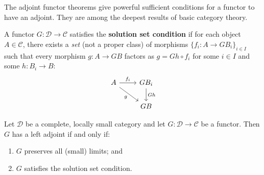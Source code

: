 The adjoint functor theorems give powerful sufficient conditions
for a functor to have an adjoint.  They are among the deepest
results of basic category theory.

\begin{definition}\label{def:solution-set}
A functor $G\colon\mathcal{D}\to\mathcal{C}$ satisfies the
\textbf{solution set condition} if for each object $A\in\mathcal{C}$,
there exists a \emph{set} (not a proper class) of morphisms
$\{f_i\colon A\to GB_i\}_{i\in I}$ such that every morphism
$g\colon A\to GB$ factors as $g = Gh\circ f_i$ for some $i\in I$
and some $h\colon B_i\to B$:
\[
\begin{tikzcd}
A \arrow[r, "f_i"] \arrow[dr, "g"'] & GB_i \arrow[d, "Gh"] \\
& GB
\end{tikzcd}
\]
\end{definition}

\begin{theorem}%
\label{thm:GAFT}
Let $\mathcal{D}$ be a complete, locally small category and let
$G\colon\mathcal{D}\to\mathcal{C}$ be a functor.
Then $G$ has a left adjoint if and only if:
\begin{enumerate}[label=(\roman*)]
\item $G$ preserves all (small) limits; and
\item $G$ satisfies the solution set condition.
\end{enumerate}
\end{theorem}

